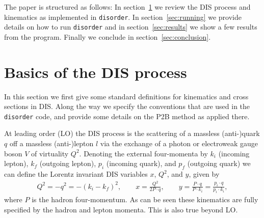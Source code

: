 \documentclass[submission, PhysCodeb]{SciPost_better_arXiv}
\newcommand{\disorder}{{\tt disorder}}
\begin{document}
The paper is structured as follows: In section~\ref{sec:dis} we review
the DIS process and kinematics as implemented in \disorder{}. In
section~\ref{sec:running} we provide details on how to run \disorder{}
and in section~\ref{sec:results} we show a few results from the
program. Finally we conclude in section~\ref{sec:conclusion}.

\section{Basics of the DIS process}
\label{sec:dis}
In this section we first give some standard definitions for kinematics
and cross sections in DIS. Along the way we specify the conventions
that are used in the \disorder{} code, and provide some details on the
P2B method as applied there.

At leading order (LO) the DIS process is
the scattering of a massless (anti-)quark $q$ off a massless
\mbox{(anti-)lepton} $l$ via the exchange of a photon or electroweak
gauge boson $V$ of virtuality $Q^2$. Denoting the external
four-momenta by $k_i$ (incoming lepton), $k_f$ (outgoing lepton),
$p_i$ (incoming quark), and $p_f$ (outgoing quark) we can define the
Lorentz invariant DIS variables $x$, $Q^2$, and $y$, given by
\begin{align}
  Q^2 = -q^2 = -(k_i - k_f)^2, \qquad  x = \frac{Q^2}{2 P \cdot q},
  \qquad  y = \frac{P \cdot q}{P \cdot k_i} = \frac{p_i \cdot q}{p_i \cdot k_i} ,
  \label{eq:dis-variables}
\end{align}
where $P$ is the hadron four-momentum. As can be seen these kinematics
are fully specified by the hadron and lepton momenta. This is also
true beyond LO.
\end{document}
